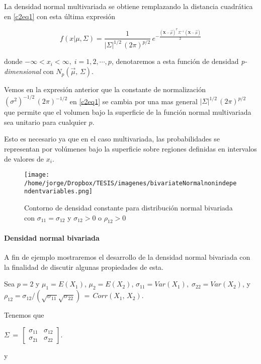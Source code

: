 \documentclass[english]{report}
\begin{document}
La densidad normal multivariada se obtiene remplazando la distancia cuadrática en \ref{c2eq1} con esta última expresión

\begin{equation}
f(x|\mu,\Sigma)=\frac{1}{|\Sigma|^{1/2}\,(2\pi)^{p/2}}\,e^{-\frac{(\textbf{X}-\vec{\mu})^T\,\Sigma^{-1}\,(\textbf{X}-\vec{\mu})}{2}}
\label{c2eq13}
\end{equation}

donde $-\infty <  x_i < \infty,\;i=1,2,\cdots,p$, denotaremos a esta función de densidad \emph{p-dimensional}  con $N_p(\vec{\mu},\,\Sigma)$.

Vemos en la expresión anterior que la constante de normalización $(\sigma^2)^{-1/2}\,(2\pi)^{-1/2}$ en \ref{c2eq1} se cambia por una mas general $|\Sigma|^{1/2}\,(2\pi)^{p/2}$ que permite que el volumen bajo la superficie de la función normal multivariada sea unitario para cualquier $p$.

Esto es necesario ya que en el caso multivariada, las probabilidades se representan por volúmenes bajo la superficie sobre regiones definidas en intervalos de valores de $x_i$.

\begin{figure}[H]
\centering
\texttt{[image: /home/jorge/Dropbox/TESIS/imagenes/bivariateNormalnonindependentvariables.png]}
\caption{Contorno de densidad constante para distribución normal bivariada con $\sigma_{11}=\sigma_{12}$ y $\sigma_{12} > 0$ o $\rho_{12} > 0$}
\label{c2f3}
\end{figure}

\paragraph{Densidad normal bivariada}

A fin de ejemplo mostraremos el desarrollo de la densidad normal bivariada con la finalidad de discutir algunas propiedades de esta.


Sea $p=2$ y $\mu_1=E(X_1)$, $\mu_2=E(X_2)$, $\sigma_{11} = Var(X_1),\;\sigma_{22}=Var(X_2)$, y $\rho_{12} = \sigma_{12}/(\sqrt{\sigma_{11}}\sqrt{\sigma_{22}})\,=\,Corr(X_1,\,X_2)$.  


Tenemos que


$\Sigma\,=\,\begin{bmatrix}\sigma_{11}&\sigma_{12}\\\sigma_{21}&\sigma_{22}\end{bmatrix}$.


y 
\end{document}
